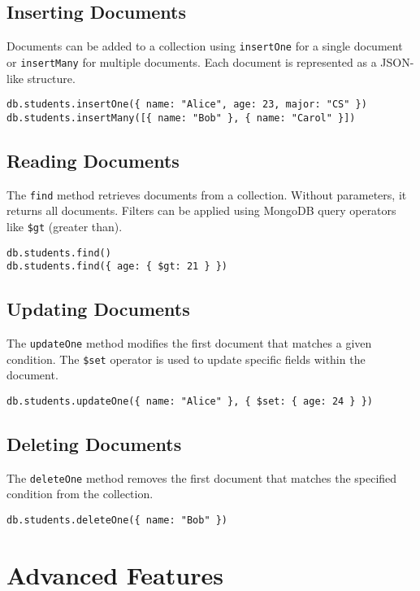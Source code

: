 \documentclass{article}
\begin{document}
\subsection{Inserting Documents}
Documents can be added to a collection using \texttt{insertOne} for a single document or \texttt{insertMany} for multiple documents. Each document is represented as a JSON-like structure.
\begin{verbatim}
db.students.insertOne({ name: "Alice", age: 23, major: "CS" })
db.students.insertMany([{ name: "Bob" }, { name: "Carol" }])
\end{verbatim}

\subsection{Reading Documents}
The \texttt{find} method retrieves documents from a collection. Without parameters, it returns all documents. Filters can be applied using MongoDB query operators like \texttt{\$gt} (greater than).
\begin{verbatim}
db.students.find()
db.students.find({ age: { $gt: 21 } })
\end{verbatim}

\subsection{Updating Documents}
The \texttt{updateOne} method modifies the first document that matches a given condition. The \texttt{\$set} operator is used to update specific fields within the document.
\begin{verbatim}
db.students.updateOne({ name: "Alice" }, { $set: { age: 24 } })
\end{verbatim}

\subsection{Deleting Documents}
The \texttt{deleteOne} method removes the first document that matches the specified condition from the collection.
\begin{verbatim}
db.students.deleteOne({ name: "Bob" })
\end{verbatim}

\section{Advanced Features}
\end{document}
